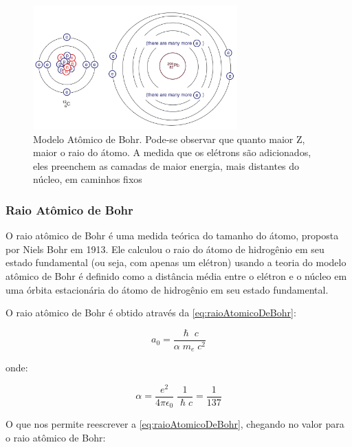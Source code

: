 \documentclass[11pt,a4paper]{article}
\begin{document}
                \begin{figure}[h]
                    \centering
                    \includegraphics[width=0.7\textwidth]{Imagens/modeloAtomicoDeBohr.jpg}
                    \caption{Modelo Atômico de Bohr. Pode-se observar que quanto maior Z, maior o raio do átomo. A medida que os elétrons são adicionados, eles preenchem as camadas de maior energia, mais distantes do núcleo, em caminhos fixos}
                    \label{fig:modeloAtomicoDeBohr}
                \end{figure}

            \subsubsection{Raio Atômico de Bohr}

                O raio atômico de Bohr é uma medida teórica do tamanho do átomo, proposta por Niels Bohr em 1913. Ele calculou o raio do átomo de hidrogênio em seu estado fundamental (ou seja, com apenas um elétron) usando a teoria do modelo atômico de Bohr é definido como a distância média entre o elétron e o núcleo em uma órbita estacionária do átomo de hidrogênio em seu estado fundamental. 

                O raio atômico de Bohr é obtido através da  \ref{eq:raioAtomicoDeBohr}:

                \begin{equation}
                    a_0 = \frac{\hslash \; c}{\alpha \; m_e \; c^2}
                    \label{eq:raioAtomicoDeBohr}
                \end{equation}

                onde:

                $$\alpha = \frac{e^2}{4 \pi \epsilon_0} \; \frac{1}{\hslash c} = \frac{1}{137}$$


                O que nos permite reescrever a  \ref{eq:raioAtomicoDeBohr}, chegando no valor para o raio atômico de Bohr:
\end{document}
